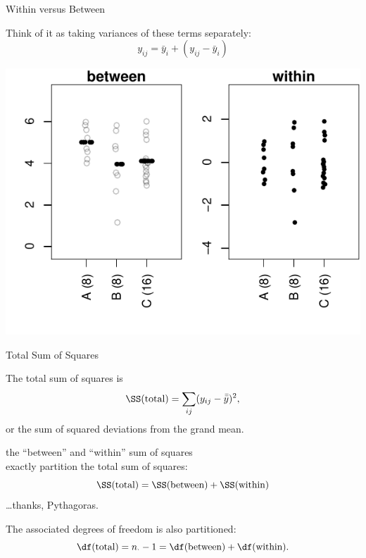 \begin{frame}{Within versus Between}

  Think of it as taking variances of these terms separately:
  \[ y_{ij} = \bar y_i + (y_{ij} - \bar y_i) \]

    \vspace{2em}


  \begin{center}
    \includegraphics[width=\textwidth]{dots2ex-within-between.pdf}
  \end{center}

\end{frame}

\begin{frame}{Total Sum of Squares}

  The \alert{total sum of squares} is
  \[ \SS(\text{total}) = \sum_{ij} (y_{ij} - \bar{\bar y})^2 , \]
  or the sum of squared deviations from the grand mean.

    \vspace{2em}

   the ``between'' and ``within'' sum of squares \\
  \alert{exactly partition} the total sum of squares:
  \[  \SS(\text{total})  = \SS(\text{between}) + \SS(\text{within}) \]
  \ldots thanks, Pythagoras.

    \vspace{2em}

    The associated degrees of freedom is also partitioned:
    \[ \df(\text{total}) = n_\cdot - 1 = \df(\text{between}) + \df(\text{within}) .  \]


\end{frame}

